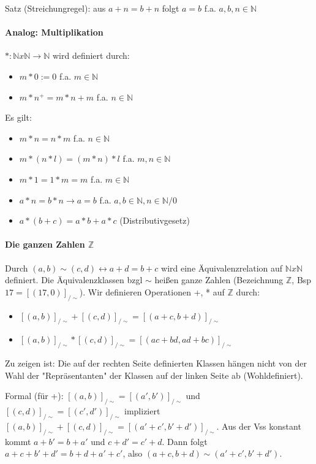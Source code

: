 \documentclass[10pt,landscape]{article}
\begin{document}
\begin{multicols}{3}
Satz (Streichungregel): aus $a+n=b+n$ folgt $a=b$ f.a. $a,b,n\in\mathbb{N}$

\paragraph{Analog: Multiplikation}
$*: \mathbb{N} x \mathbb{N} \rightarrow \mathbb{N}$ wird definiert durch:
\begin{itemize}
    \item $m*0:=0$ f.a. $m\in \mathbb{N}$
    \item $m*n^+=m*n+m$ f.a. $n\in\mathbb{N}$
\end{itemize}
Es gilt:
\begin{itemize}
    \item $m*n=n*m$ f.a. $n\in\mathbb{N}$
    \item $m*(n*l)=(m*n)*l$ f.a. $m,n\in\mathbb{N}$
    \item $m*1 = 1*m =m$ f.a. $m\in\mathbb{N}$
    \item $a*n=b*n \rightarrow a=b$ f.a. $a,b\in\mathbb{N}, n\in\mathbb{N}/{0}$
    \item $a*(b+c)=a*b+a*c$ (Distributivgesetz)
\end{itemize}

\paragraph{Die ganzen Zahlen $\mathbb{Z}$}
Durch $(a,b)\sim (c,d)\leftrightarrow a+d=b+c$ wird eine Äquivalenzrelation auf $\mathbb{N} x\mathbb{N}$ definiert.
Die Äquivalenzklassen bzgl $\sim$ heißen ganze Zahlen (Bezeichnung $\mathbb{Z}$, Bsp $17=[(17,0)]_{/\sim }$).
Wir definieren Operationen +, * auf $\mathbb{Z}$ durch:
\begin{itemize}
    \item $[(a,b)]_{/\sim } + [(c,d)]_{/\sim } = [(a+c, b+d)]_{/\sim }$
    \item $[(a,b)]_{/\sim } * [(c,d)]_{/\sim } = [(ac+bd, ad+bc)]_{/\sim }$
\end{itemize}
Zu zeigen ist: Die auf der rechten Seite definierten Klassen hängen nicht von der Wahl der "Repräsentanten" der Klassen auf der linken Seite ab (Wohldefiniert).

Formal (für +): $[(a,b)]_{/\sim } = [(a',b')]_{/\sim }$ und $[(c,d)]_{/\sim } = [(c',d')]_{/\sim }$ impliziert $[(a,b)]_{/\sim } + [(c,d)]_{/\sim } = [(a'+c', b'+d')]_{/\sim }$. Aus der Vss konstant kommt $a+b'=b+a'$ und $c+d'=c'+d$. Dann folgt $a+c+b'+d'=b+d+a'+c'$, also $(a+c, b+d)\sim (a'+c',b'+d')$.


\end{multicols}
\end{document}
